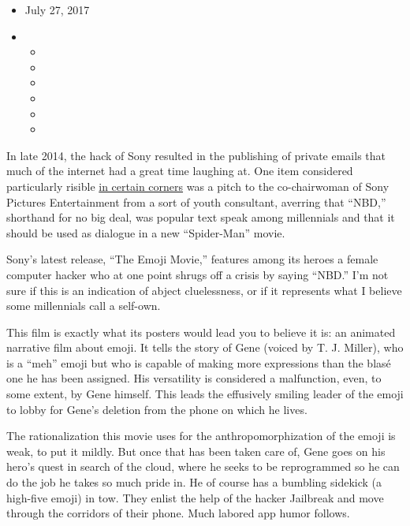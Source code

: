 \begin{itemize}
\item
  July 27, 2017
\item
  \begin{itemize}
  \item
  \item
  \item
  \item
  \item
  \item
  \end{itemize}
\end{itemize}

In late 2014, the hack of Sony resulted in the publishing of private
emails that much of the internet had a great time laughing at. One item
considered particularly risible
\href{http://www.avclub.com/article/spider-man-should-be-snapchatting-edm-fan-accordin-218519}{in
certain corners} was a pitch to the co-chairwoman of Sony Pictures
Entertainment from a sort of youth consultant, averring that ``NBD,''
shorthand for no big deal, was popular text speak among millennials and
that it should be used as dialogue in a new ``Spider-Man'' movie.

Sony's latest release, ``The Emoji Movie,'' features among its heroes a
female computer hacker who at one point shrugs off a crisis by saying
``NBD.'' I'm not sure if this is an indication of abject cluelessness,
or if it represents what I believe some millennials call a self-own.

This film is exactly what its posters would lead you to believe it is:
an animated narrative film about emoji. It tells the story of Gene
(voiced by T. J. Miller), who is a ``meh'' emoji but who is capable of
making more expressions than the blasé one he has been assigned. His
versatility is considered a malfunction, even, to some extent, by Gene
himself. This leads the effusively smiling leader of the emoji to lobby
for Gene's deletion from the phone on which he lives.

The rationalization this movie uses for the anthropomorphization of the
emoji is weak, to put it mildly. But once that has been taken care of,
Gene goes on his hero's quest in search of the cloud, where he seeks to
be reprogrammed so he can do the job he takes so much pride in. He of
course has a bumbling sidekick (a high-five emoji) in tow. They enlist
the help of the hacker Jailbreak and move through the corridors of their
phone. Much labored app humor follows.

